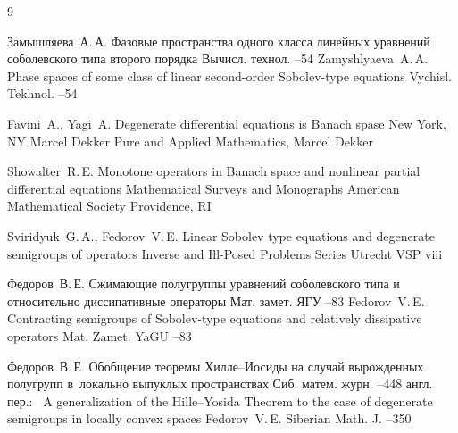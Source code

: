
\begin{thebibliography}{9}

 \by Замышляева~А.\,А. \paper
Фазовые пространства одного класса линейных уравнений соболевского
типа второго порядка \jour Вычисл. технол. 
--54
\misctransl
\by Zamyshlyaeva~A.\,A.
\paper Phase spaces of some class of linear second-order Sobolev-type equations
\jour Vychisl. Tekhnol. 
--54 

 \by Favini~A., Yagi~A. 
\book Degenerate differential equations is Banach spase 
\publaddr New York, NY 
\publ Marcel Dekker 
\serial Pure and Applied Mathematics, Marcel Dekker


\by Showalter~R.\,E. 
\book  Monotone operators in Banach space and nonlinear partial differential equations
\serial Mathematical Surveys and Monographs
\publ American Mathematical Society
\publaddr Providence, RI

\by  Sviridyuk~G.\,A., Fedorov~V.\,E. 
\book Linear Sobolev type equations and degenerate semigroups of operators
\serial Inverse and Ill-Posed Problems Series
\publaddr Utrecht
\publ VSP
\vol viii

 \by Федоров~В.\,Е. 
\paper Сжимающие полугруппы уравнений соболевского типа и относительно диссипативные операторы 
\jour Мат. замет. ЯГУ 
 --83
\misctransl
\by Fedorov~V.\,E.
\paper Contracting semigroups of Sobolev-type equations and relatively dissipative operators
\jour Mat. Zamet. YaGU 
--83 

 \by Федоров~В.\,Е. 
\paper Обобщение теоремы Хилле--Иосиды на случай вырожденных полугрупп в~локально выпуклых пространствах
\jour Сиб. матем. журн.
--448
\transl англ. пер.:~
\paper A generalization of the Hille--Yosida Theorem to the case of degenerate semigroups in locally convex spaces
\by Fedorov~V.\,E.
\jour Siberian Math. J.
--350

\end{thebibliography}



\noindent
\hskip6.5cm \thedate \par\noindent
\hskip6.5cm\therevdate




\makeengtitlem



 \newpage
%
%
%
